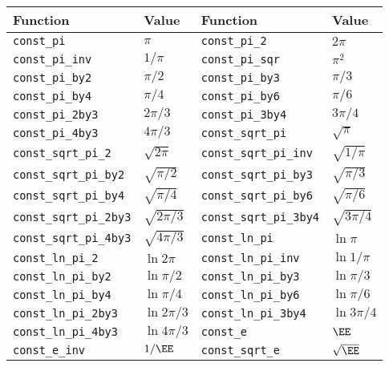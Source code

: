 \begin{table}
  \begin{tabularx}{\textwidth}{XXXX}
    \toprule
    Function & Value & Function & Value \\
    \midrule
    \verb|const_pi|           & $\pi$           &
    \verb|const_pi_2|         & $2\pi$          \\
    \verb|const_pi_inv|       & $1/\pi$         &
    \verb|const_pi_sqr|       & $\pi^2$         \\
    \verb|const_pi_by2|       & $\pi/2$         &
    \verb|const_pi_by3|       & $\pi/3$         \\
    \verb|const_pi_by4|       & $\pi/4$         &
    \verb|const_pi_by6|       & $\pi/6$         \\
    \verb|const_pi_2by3|      & $2\pi/3$        &
    \verb|const_pi_3by4|      & $3\pi/4$        \\
    \verb|const_pi_4by3|      & $4\pi/3$        &
    \verb|const_sqrt_pi|      & $\sqrt{\pi}$    \\
    \verb|const_sqrt_pi_2|    & $\sqrt{2\pi}$   &
    \verb|const_sqrt_pi_inv|  & $\sqrt{1/\pi}$  \\
    \verb|const_sqrt_pi_by2|  & $\sqrt{\pi/2}$  &
    \verb|const_sqrt_pi_by3|  & $\sqrt{\pi/3}$  \\
    \verb|const_sqrt_pi_by4|  & $\sqrt{\pi/4}$  &
    \verb|const_sqrt_pi_by6|  & $\sqrt{\pi/6}$  \\
    \verb|const_sqrt_pi_2by3| & $\sqrt{2\pi/3}$ &
    \verb|const_sqrt_pi_3by4| & $\sqrt{3\pi/4}$ \\
    \verb|const_sqrt_pi_4by3| & $\sqrt{4\pi/3}$ &
    \verb|const_ln_pi|        & $\ln{\pi}$      \\
    \verb|const_ln_pi_2|      & $\ln{2\pi}$     &
    \verb|const_ln_pi_inv|    & $\ln{1/\pi}$    \\
    \verb|const_ln_pi_by2|    & $\ln{\pi/2}$    &
    \verb|const_ln_pi_by3|    & $\ln{\pi/3}$    \\
    \verb|const_ln_pi_by4|    & $\ln{\pi/4}$    &
    \verb|const_ln_pi_by6|    & $\ln{\pi/6}$    \\
    \verb|const_ln_pi_2by3|   & $\ln{2\pi/3}$   &
    \verb|const_ln_pi_3by4|   & $\ln{3\pi/4}$   \\
    \verb|const_ln_pi_4by3|   & $\ln{4\pi/3}$   &
    \verb|const_e|            & $\EE$           \\
    \verb|const_e_inv|        & $1/\EE$         &
    \verb|const_sqrt_e|       & $\sqrt{\EE}$    \\

\end{tabularx}
\end{table}
